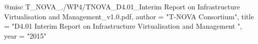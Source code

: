 @misc{ T_NOVA_./WP4/TNOVA_D4.01_Interim Report on Infrastructure Virtualisation and Management_v1.0.pdf,
       author = "T-NOVA Consortium",
       title = "D4.01 Interim Report on Infrastructure Virtualisation and Management ",
       year = "2015" }
